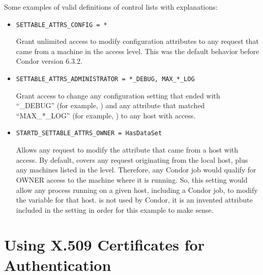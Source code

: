 Some examples of valid definitions of control lists with explanations:

\begin{itemize}

\item \begin{verbatim}SETTABLE_ATTRS_CONFIG = *\end{verbatim}
Grant unlimited access to modify configuration attributes
to any request that came from a machine in the  access
level. 
This was the default behavior before Condor version 6.3.2.

\item \begin{verbatim}SETTABLE_ATTRS_ADMINISTRATOR = *_DEBUG, MAX_*_LOG\end{verbatim} 
Grant access to change any configuration setting that ended
with ``\_DEBUG'' (for example, ) and any
attribute that matched ``MAX\_*\_LOG'' (for example,
) to any host with 
access. 

\item \begin{verbatim}STARTD_SETTABLE_ATTRS_OWNER = HasDataSet\end{verbatim}
Allows any request to modify the  
attribute that came from a host with  access.
By default,  covers any request originating from the
local host, plus any machines listed in the 
level.
Therefore, any Condor job would qualify for OWNER access to the
machine where it is running. 
So, this setting would allow any process running on a given host,
including a Condor job, to modify the  variable for
that host. 
 is not used by Condor, it is an invented attribute
included in the  setting in order for this
example to make sense.

\end{itemize}


\section{\label{sec:X509-Authentication}Using X.509 Certificates for
Authentication} 


